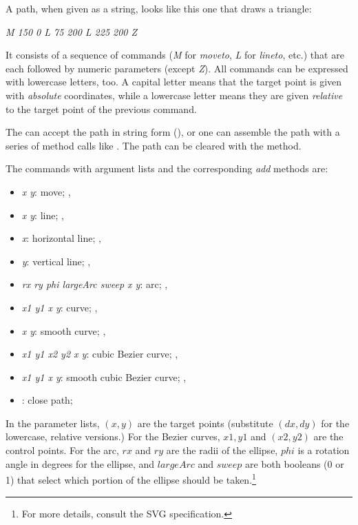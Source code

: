 A path, when given as a string, looks like this one that draws a triangle:

\textit{M 150 0 L 75 200 L 225 200 Z}

It consists of a sequence of commands (\textit{M} for \textit{moveto},
\textit{L} for \textit{lineto}, etc.) that are each followed by numeric
parameters (except \textit{Z}). All commands can be expressed with
lowercase letters, too. A capital letter means that the target point is
given with \textit{absolute} coordinates, while a lowercase letter means they are
given \textit{relative} to the target point of the previous command.

The  can accept the path in string form (),
or one can assemble the path with a series of method calls like
. The path can be cleared with the 
method.

The commands with argument lists and the corresponding \textit{add} methods are:

\begin{itemize}
\item {} \textit{x y}: move; , 
\item {} \textit{x y}: line; , 
\item {} \textit{x}: horizontal line; , 
\item {} \textit{y}: vertical line; , 
\item {} \textit{rx ry phi largeArc sweep x y}: arc; , 
\item {} \textit{x1 y1 x y}: curve; , 
\item {} \textit{x y}: smooth curve; , 
\item {} \textit{x1 y1 x2 y2 x y}: cubic Bezier curve; , 
\item {} \textit{x1 y1 x y}: smooth cubic Bezier curve; , 
\item {}: close path; 
\end{itemize}

In the parameter lists, $(x,y)$ are the target points (substitute $(dx,dy)$ for
the lowercase, relative versions.) For the Bezier curves, $x1,y1$ and
$(x2,y2)$ are the control points. For the arc, $rx$ and $ry$ are the radii of the
ellipse, $phi$ is a rotation angle in degrees for the ellipse, and
$largeArc$ and $sweep$ are both booleans (0 or 1) that select which portion
of the ellipse should be taken.\footnote{For more details, consult the SVG
specification.}

